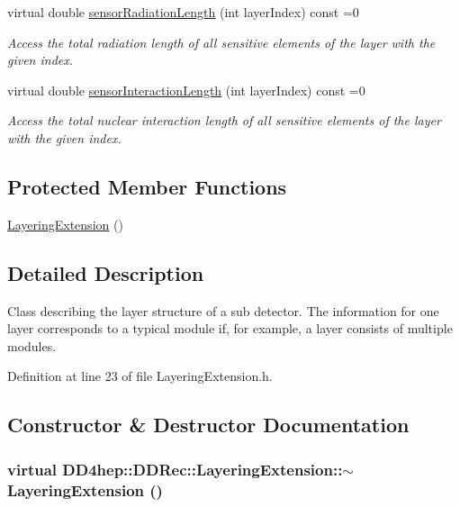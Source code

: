 \begin{DoxyCompactItemize}
virtual double \hyperlink{class_d_d4hep_1_1_d_d_rec_1_1_layering_extension_a1328587b943abe82353de131d9fac071}{sensorRadiationLength} (int layerIndex) const =0
\begin{DoxyCompactList}\small\item\em Access the total radiation length of all sensitive elements of the layer with the given index. \item\end{DoxyCompactList}\item 
virtual double \hyperlink{class_d_d4hep_1_1_d_d_rec_1_1_layering_extension_a99d3faa45e42d0a34635ea7f3ac2c038}{sensorInteractionLength} (int layerIndex) const =0
\begin{DoxyCompactList}\small\item\em Access the total nuclear interaction length of all sensitive elements of the layer with the given index. \item\end{DoxyCompactList}\end{DoxyCompactItemize}
\subsection*{Protected Member Functions}
\begin{DoxyCompactItemize}
\item 
\hyperlink{class_d_d4hep_1_1_d_d_rec_1_1_layering_extension_abea54214401d949b2b3313e0c1d448af}{LayeringExtension} ()
\end{DoxyCompactItemize}


\subsection{Detailed Description}
Class describing the layer structure of a sub detector. The information for one layer corresponds to a typical module if, for example, a layer consists of multiple modules. 

Definition at line 23 of file LayeringExtension.h.

\subsection{Constructor \& Destructor Documentation}
\hypertarget{class_d_d4hep_1_1_d_d_rec_1_1_layering_extension_aab6b9c7fe676917e07c53cffbdd87767}{
\subsubsection[{$\sim$LayeringExtension}]{\setlength{\rightskip}{0pt plus 5cm}virtual DD4hep::DDRec::LayeringExtension::$\sim$LayeringExtension ()}}
\label{class_d_d4hep_1_1_d_d_rec_1_1_layering_extension_aab6b9c7fe676917e07c53cffbdd87767}



